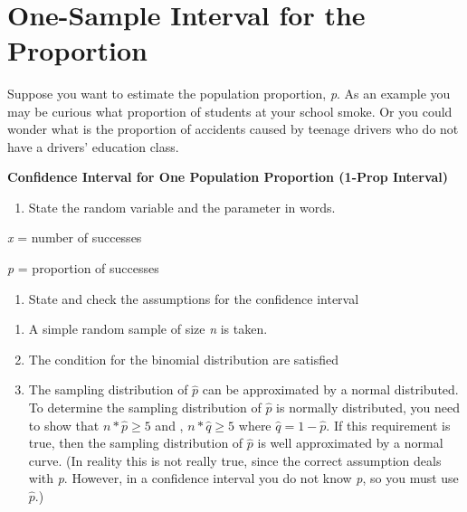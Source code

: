 \documentclass[
]{book}
\providecommand{\tightlist}{%
  \setlength{\itemsep}{0pt}\setlength{\parskip}{0pt}}
\begin{document}
\textbf{~
}

\hypertarget{one-sample-interval-for-the-proportion}{%
\section{One-Sample Interval for the Proportion}\label{one-sample-interval-for-the-proportion}}

Suppose you want to estimate the population proportion, \emph{p}. As an example you may be curious what proportion of students at your school smoke. Or you could wonder what is the proportion of accidents caused by teenage drivers who do not have a drivers' education class.

\textbf{Confidence Interval for One Population Proportion (1-Prop Interval)}

\begin{enumerate}
\def\labelenumi{\arabic{enumi}.}
\tightlist
\item
  State the random variable and the parameter in words.
\end{enumerate}

\emph{x} = number of successes

\emph{p} = proportion of successes

\begin{enumerate}
\def\labelenumi{\arabic{enumi}.}
\setcounter{enumi}{1}
\tightlist
\item
  State and check the assumptions for the confidence interval
\end{enumerate}

\begin{enumerate}
\def\labelenumi{\alph{enumi}.}
\item
  A simple random sample of size \emph{n} is taken.
\item
  The condition for the binomial distribution are satisfied
\item
  The sampling distribution of \(\hat{p}\) can be approximated by a normal distributed. To determine the sampling distribution of \(\hat{p}\) is normally distributed, you need to show that \(n*\hat{p}\ge5\) and , \(n*\hat{q}\ge5\) where \(\hat{q}=1-\hat{p}\). If this requirement is true, then the sampling distribution of \(\hat{p}\) is well approximated by a normal curve. (In reality this is not really true, since the correct assumption deals with \emph{p}. However, in a confidence interval you do not know \emph{p}, so you must use \(\hat{p}\).)
\end{enumerate}
\end{document}
